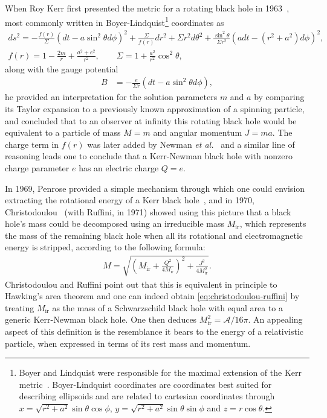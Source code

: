\documentclass[
twoside,
openright,
frontopenright,
]{dmathesis}
\newcommand{\nn}{\nonumber}
\begin{document}
When Roy Kerr first presented the metric for a rotating black hole in
1963~\cite{Kerr:1963ud}, most commonly written in Boyer-Lindquist\footnote{Boyer
  and Lindquist were responsible for the maximal extension of the Kerr
  metric~\cite{Boyer:1966qh}. Boyer-Lindquist coordinates are coordinates best
  suited for describing ellipsoids and are related to cartesian coordinates
  through $ x = \sqrt{r^2+a^2}\sin\theta\cos\phi$,
  $y = \sqrt{r^2 + a^2}\sin\theta \sin \phi$ and $z=r\cos\theta$.} coordinates
as
\begin{gather}
  ds^2 = -\frac{f(r)}{\Sigma}(dt - a \sin^2 \theta d\phi)^2 +
  \frac{\Sigma}{f(r)}dr^2 + \Sigma r^2 d\theta^2 + \frac{\sin^2\theta}{\Sigma
  r^2}(adt - (r^2+a^2)d\phi)^2,\nn\\
  f(r) = 1- \frac{2m}{r} + \frac{a^2+e^2}{r^2}, \qquad \Sigma = 1+\frac{a^2}{r^2}\cos^2\theta,
  \label{eq:kerrAF}
\end{gather}
along with the gauge potential
\begin{align}
  B&=-\frac{e}{\Sigma r}(dt-a\sin^2\theta d\phi),
\end{align}
he provided an interpretation for the solution parameters $m$ and $a$ by
comparing its Taylor expansion to a previously known approximation of a spinning
particle, and concluded that to an observer at infinity this rotating black hole
would be equivalent to a particle of mass $M=m$ and angular momentum $J=ma$. The
charge term in $f(r)$ was later added by Newman \emph{et
  al.}~\cite{Newman:1965my} and a similar line of reasoning leads one to
conclude that a Kerr-Newman black hole with nonzero charge parameter $e$ has an
electric charge $Q = e$.

In 1969, Penrose provided a simple mechanism through which one could envision
extracting the rotational energy of a Kerr black hole~\cite{Penrose:1969pc}, and
in 1970, Christodoulou~\cite{Christodoulou:1970wf,Christodoulou:1972kt} (with
Ruffini, in 1971) showed using this picture that a black hole's mass could be
decomposed using an irreducible mass $M_\mathrm{ir}$, which represents the mass
of the remaining black hole when all its rotational and electromagnetic energy
is stripped, according to the following formula:
\begin{align}
  \label{eq:christodoulou-ruffini}
  M=\sqrt{\left(M_\mathrm{ir}+\frac{Q^2}{4M_\mathrm{ir}}\right)^2 + \frac{J^2}{4M_\mathrm{ir}^2}}.
\end{align}
Christodoulou and Ruffini point out that this is equivalent in principle to
Hawking's area theorem and one can indeed obtain \cref{eq:christodoulou-ruffini}
by treating $M_\mathrm{ir}$ as the mass of a Schwarzschild black hole with equal
area to a generic Kerr-Newman black hole. One then deduces
$M_\mathrm{ir}^2 = \mathcal{A}/16\pi$. An appealing aspect of this definition is
the resemblance it bears to the energy of a relativistic particle, when
expressed in terms of its rest mass and momentum.
\end{document}
